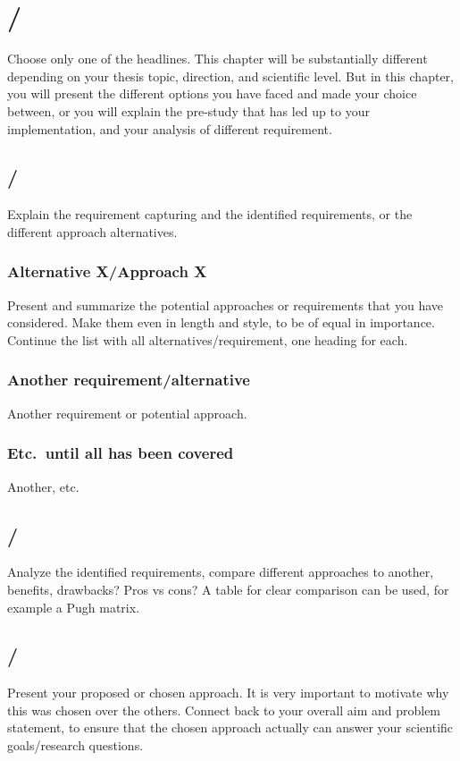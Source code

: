 \section{/}\label{sec:prestudy} 

Choose only one of the headlines. This chapter will be substantially different depending on your
thesis topic, direction, and scientific level. But in this chapter, you will present the different
options you have faced and made your choice between, or you will explain the pre-study that has led
up to your implementation, and your analysis of different requirement.        

\subsection{/}\label{subsec:solutionalt}
Explain the requirement capturing and the identified requirements, or the different approach alternatives.

\subsubsection{Alternative X/Approach X}\label{subsubsec:altx}
Present and summarize the potential approaches or requirements that you have considered. Make them
even in length and style, to be of equal in importance. Continue the list with all
alternatives/requirement, one heading for each.

\subsubsection{Another requirement/alternative}
Another requirement or potential approach.

\subsubsection{Etc.\ until all has been covered}
Another, etc.

\subsection{/}\label{subsec:compareapproach}
Analyze the identified requirements, compare different approaches to another, benefits, drawbacks?
Pros vs cons? A table for clear comparison can be used, for example a Pugh matrix.

\subsection{/}\label{subsec:chosenapproach}
Present your proposed or chosen approach. It is very important to motivate why this was chosen over
the others. Connect back to your overall aim and problem statement, to ensure that the chosen
approach actually can answer your scientific goals/research questions.

